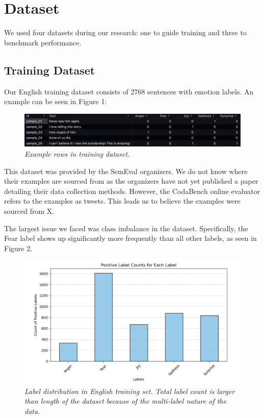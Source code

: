\documentclass[11pt]{article}
\begin{document}
\section{Dataset}

We used four datasets during our research: one to guide training and three to benchmark performance.

\subsection{Training Dataset}
Our English training dataset consists of 2768 sentences with emotion labels. An example can be seen in Figure 1:

\begin{figure}
    \centering
    \includegraphics[width=\columnwidth]{dataset_preview}
    \caption{\textit{Example rows in training dataset.}}
\end{figure}

This dataset was provided by the SemEval organizers. We do not know where their examples are sourced from as the organizers have not yet published a paper detailing their data collection methods. However, the CodaBench online evaluator refers to the examples as tweets. This leads us to believe the examples were sourced from X. 

The largest issue we faced was class imbalance in the dataset. Specifically, the Fear label shows up significantly more frequently than all other labels, as seen in Figure 2.

\begin{figure}
    \centering
    \includegraphics[width=\columnwidth]{train_labels.png}
    \caption{\textit{Label distribution in English training set. Total label count is larger than length of the dataset because of the multi-label nature of the data.}}
\end{figure}
\end{document}
